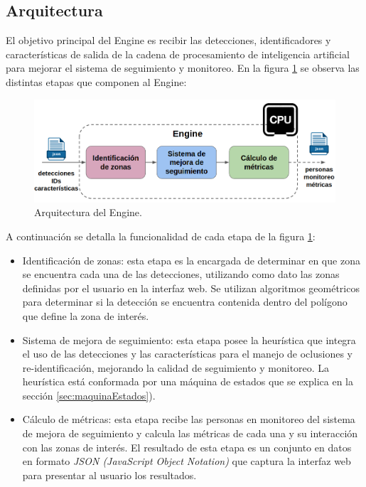 \subsection{Arquitectura}

El objetivo principal del Engine es recibir las detecciones, identificadores y características de salida de la cadena de procesamiento de inteligencia artificial para mejorar el sistema de seguimiento y monitoreo. En la figura \ref{fig:arquitecturaEngine} se observa las distintas etapas que componen al Engine:

\begin{figure}[ht]
	\centering
	\includegraphics[scale=.5]{./Figures/arquitecturaEngine.png}
	\caption{Arquitectura del Engine.}
	\label{fig:arquitecturaEngine}
\end{figure}

A continuación se detalla la funcionalidad de cada etapa de la figura \ref{fig:arquitecturaEngine}:
\begin{itemize}
\item Identificación de zonas: esta etapa es la encargada de determinar en que zona se encuentra cada una de las detecciones, utilizando como dato las zonas definidas por el usuario en la interfaz web. Se utilizan algoritmos geométricos para determinar si la detección se encuentra contenida dentro del polígono que define la zona de interés.
\item Sistema de mejora de seguimiento: esta etapa posee la heurística que integra el uso de las detecciones y las características para el manejo de oclusiones y re-identificación, mejorando la calidad de seguimiento y monitoreo. La heurística está conformada por una máquina de estados que se explica en la sección \ref{sec:maquinaEstados}).
\item Cálculo de métricas: esta etapa recibe las personas en monitoreo del sistema de mejora de seguimiento y calcula las métricas de cada una y su interacción con las zonas de interés. El resultado de esta etapa es un conjunto en datos en formato \textit{JSON (JavaScript Object Notation)} que captura la interfaz web para presentar al usuario los resultados.
\end{itemize}

